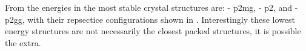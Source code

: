From the energies in  the most stable crystal structures are: \sone{} - p2mg, \scon{} - p2, and \tri{} - p2gg, with their repsectice configurations shown in . Interestingly these lowest energy structures are not necessarily the closest packed structures, it is possible the extra.

\begin{figure}
    \centering
    \begin{subfigure}[t]{0.45\linewidth}
        \caption{}
        \label{fig:crystal sone}
    \end{subfigure}\hfill
    \begin{subfigure}[t]{0.45\linewidth}%
        \caption{}
        \label{fig:crystal scon}
    \end{subfigure}
    \begin{subfigure}{0.45\linewidth}
        \caption{}
        \label{fig:crystal tri}
    \end{subfigure}
    \caption{}
    \label{fig:crystals}
\end{figure}


